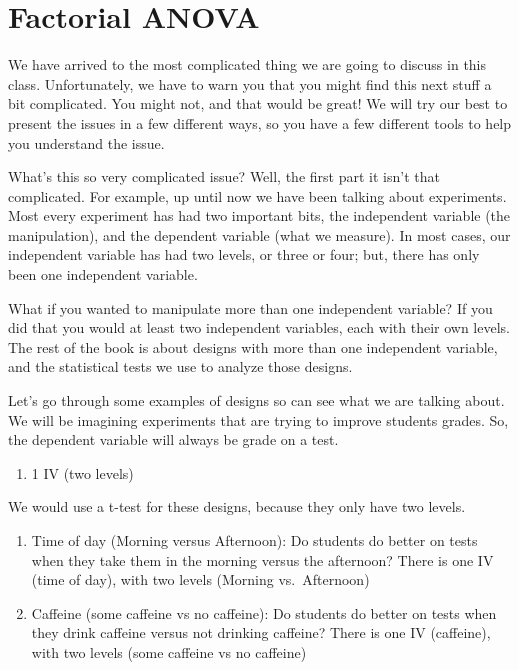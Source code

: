 \documentclass[]{book}
\providecommand{\tightlist}{%
  \setlength{\itemsep}{0pt}\setlength{\parskip}{0pt}}
\begin{document}
\hypertarget{factorial-anova}{%
\chapter{Factorial ANOVA}\label{factorial-anova}}

We have arrived to the most complicated thing we are going to discuss in this class. Unfortunately, we have to warn you that you might find this next stuff a bit complicated. You might not, and that would be great! We will try our best to present the issues in a few different ways, so you have a few different tools to help you understand the issue.

What's this so very complicated issue? Well, the first part it isn't that complicated. For example, up until now we have been talking about experiments. Most every experiment has had two important bits, the independent variable (the manipulation), and the dependent variable (what we measure). In most cases, our independent variable has had two levels, or three or four; but, there has only been one independent variable.

What if you wanted to manipulate more than one independent variable? If you did that you would at least two independent variables, each with their own levels. The rest of the book is about designs with more than one independent variable, and the statistical tests we use to analyze those designs.

Let's go through some examples of designs so can see what we are talking about. We will be imagining experiments that are trying to improve students grades. So, the dependent variable will always be grade on a test.

\begin{enumerate}
\def\labelenumi{\arabic{enumi}.}
\tightlist
\item
  1 IV (two levels)
\end{enumerate}

We would use a t-test for these designs, because they only have two levels.

\begin{enumerate}
\def\labelenumi{\alph{enumi}.}
\item
  Time of day (Morning versus Afternoon): Do students do better on tests when they take them in the morning versus the afternoon? There is one IV (time of day), with two levels (Morning vs.~Afternoon)
\item
  Caffeine (some caffeine vs no caffeine): Do students do better on tests when they drink caffeine versus not drinking caffeine? There is one IV (caffeine), with two levels (some caffeine vs no caffeine)
\end{enumerate}
\end{document}
